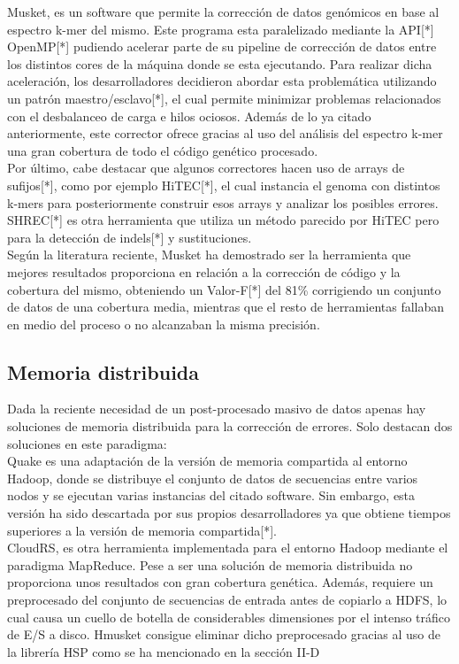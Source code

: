 \documentclass[conference]{IEEEtran}
\begin{document}
Musket\cite{musket}, es un software que permite la corrección de datos genómicos en base al espectro k-mer del mismo. Este programa esta paralelizado mediante la API[*] OpenMP[*] pudiendo acelerar parte de su pipeline de corrección de datos entre los distintos cores de la máquina donde se esta ejecutando. Para realizar dicha aceleración, los desarrolladores decidieron abordar esta problemática utilizando un patrón maestro/esclavo[*], el cual permite minimizar problemas relacionados con el desbalanceo de carga e hilos ociosos. Además de lo ya citado anteriormente, este corrector ofrece gracias al uso del análisis del espectro k-mer una gran cobertura de todo el código genético procesado.\\


Por último, cabe destacar que algunos correctores hacen uso de arrays de sufijos[*], como por ejemplo HiTEC[*], el cual instancia el genoma con distintos k-mers para posteriormente construir esos arrays y analizar los posibles errores. SHREC[*] es otra herramienta que utiliza un método parecido por HiTEC pero para la detección de indels[*] y sustituciones.\\

Según la literatura reciente\cite{comparative}, Musket ha demostrado ser la herramienta que mejores resultados proporciona en relación a la corrección de código y la cobertura del mismo, obteniendo un Valor-F[*] del 81\% corrigiendo un conjunto de datos de una cobertura media, mientras que el resto de herramientas fallaban en medio del proceso o no alcanzaban la misma precisión.

\subsection{Memoria distribuida}
Dada la reciente necesidad de un post-procesado masivo de datos apenas hay soluciones de memoria distribuida para la corrección de errores. Solo destacan dos soluciones en este paradigma:\\

Quake es una adaptación de la versión de memoria compartida al entorno Hadoop, donde se distribuye el conjunto de datos de secuencias entre varios nodos y se ejecutan varias instancias del citado software. Sin embargo, esta versión ha sido descartada por sus propios desarrolladores ya que obtiene tiempos superiores a la versión de memoria compartida[*].\\

CloudRS\cite{cloudrs}, es otra herramienta implementada para el entorno Hadoop mediante el paradigma MapReduce. Pese a ser una solución de memoria distribuida no proporciona unos resultados con gran cobertura genética. Además, requiere un preprocesado del conjunto de secuencias de entrada antes de copiarlo a HDFS, lo cual causa un cuello de botella de considerables dimensiones por el intenso tráfico de E/S a disco. Hmusket consigue eliminar dicho preprocesado gracias al uso de la librería HSP\cite{hsp} como se ha mencionado en la sección II-D\\
\end{document}
